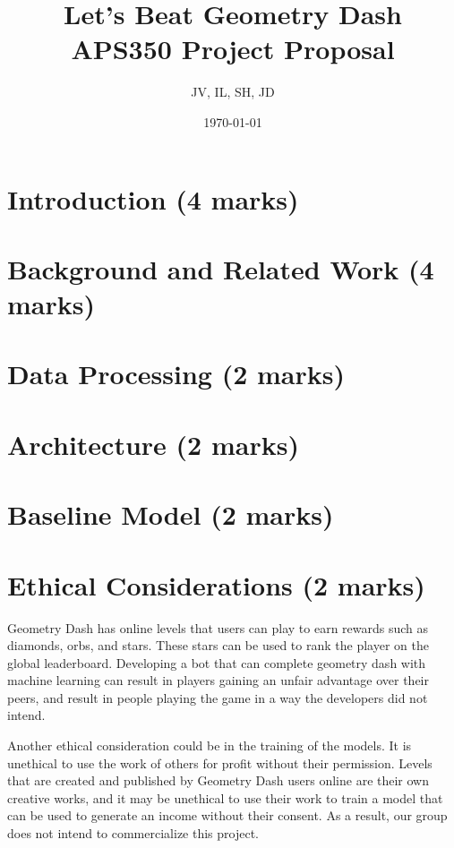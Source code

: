\documentclass{article}
\title{%
  Let's Beat Geometry Dash \\
  \large APS350 Project Proposal
  }
\author{JV, IL, SH, JD}
\date{\today}
\begin{document}
\maketitle

\pagebreak
\section{Introduction (4 marks)}

\section{Background and Related Work (4 marks)}

\section{Data Processing (2 marks)}

\section{Architecture (2 marks)}

\section{Baseline Model (2 marks)}

\section{Ethical Considerations (2 marks)}
Geometry Dash has online levels that users can play to earn rewards such as diamonds, orbs, and stars. These stars can be used to rank the player on the global leaderboard. Developing a bot that can complete geometry dash with machine learning can result in players gaining an unfair advantage over their peers, and result in people playing the game in a way the developers did not intend.

Another ethical consideration could be in the training of the models. It is unethical to use the work of others for profit without their permission. Levels that are created and published by Geometry Dash users online are their own creative works, and it may be unethical to use their work to train a model that can be used to generate an income without their consent. As a result, our group does not intend to commercialize this project.
\end{document}
